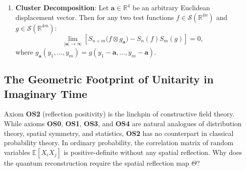 \begin{axiom}
\begin{enumerate}
    \item[\textbf{OS4}] \textbf{Cluster Decomposition}: Let $\mathbf{a} \in \mathbb{R}^4$ be an arbitrary Euclidean displacement vector. Then for any two test functions $f \in \mathcal{S}(\mathbb{R}^{4n})$ and $g \in \mathcal{S}(\mathbb{R}^{4m})$:
    \begin{equation}
    \label{eq:os4_clustering}
    \lim_{|\mathbf{a}| \to \infty} \left[ S_{n+m}\bigl( f \otimes g_{\mathbf{a}} \bigr) - S_n(f) S_m(g) \right] = 0,
    \end{equation}
    where $g_{\mathbf{a}}(y_1, \dots, y_m) = g(y_1 - \mathbf{a}, \dots, y_m - \mathbf{a})$.
\end{enumerate}
\end{axiom}

\subsection{The Geometric Footprint of Unitarity in Imaginary Time}
\label{subsec:os_reflection_positivity_structure}

Axiom \textbf{OS2} (reflection positivity) is the linchpin of constructive field theory. While axioms \textbf{OS0}, \textbf{OS1}, \textbf{OS3}, and \textbf{OS4} are natural analogues of distribution theory, spatial symmetry, and statistics, \textbf{OS2} has no counterpart in classical probability theory. In ordinary probability, the correlation matrix of random variables $\mathbb{E}[X_i X_j]$ is positive-definite without any spatial reflection. Why does the quantum reconstruction require the spatial reflection map $\Theta$?

